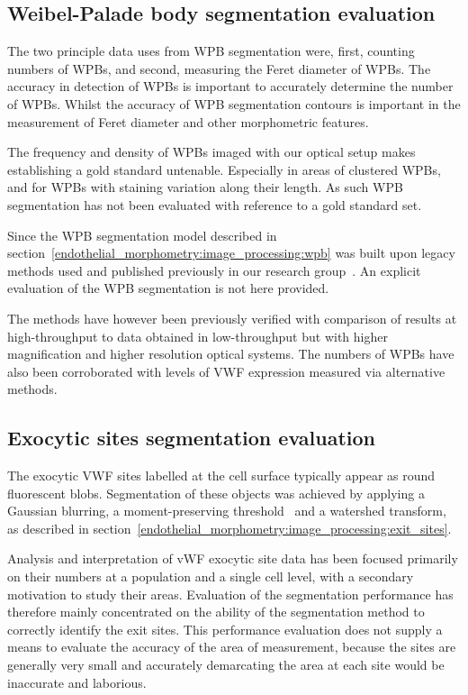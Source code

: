 \subsection{Weibel-Palade body segmentation evaluation}
\label{endothelial_morphometry:performance_evaluation:WPB}
The two principle data uses from WPB segmentation were, first, counting numbers of WPBs, and second, measuring the Feret diameter of WPBs. The accuracy in detection of WPBs is important to accurately determine the number of WPBs. Whilst the accuracy of WPB segmentation contours is important in the measurement of Feret diameter and other morphometric features.

The frequency and density of WPBs imaged with our optical setup makes establishing a gold standard untenable. Especially in areas of clustered WPBs, and for WPBs with staining variation along their length. As such WPB segmentation has not been evaluated with reference to a gold standard set.

Since the WPB segmentation model described in section~\ref{endothelial_morphometry:image_processing:wpb} was built upon legacy methods used and published previously in our research group~\cite{Ferraro2014, Stevenson2014}. An explicit evaluation of the WPB segmentation is not here provided.

The methods have however been previously verified with comparison of results at high-throughput to data obtained in low-throughput but with higher magnification and higher resolution optical systems. The numbers of WPBs have also been corroborated with levels of VWF expression measured via alternative methods.

\subsection{Exocytic sites segmentation evaluation}
\label{endothelial_morphometry:performance_evaluation:exit_sites}
The exocytic VWF sites labelled at the cell surface typically appear as round fluorescent blobs. Segmentation of these objects was achieved by applying a Gaussian blurring, a moment-preserving threshold~\cite{Tsai1985} and a watershed transform, as described in section~\ref{endothelial_morphometry:image_processing:exit_sites}.

Analysis and interpretation of vWF exocytic site data has been focused primarily on their numbers at a population and a single cell level, with a secondary motivation to study their areas. Evaluation of the segmentation performance has therefore mainly concentrated on the ability of the segmentation method to correctly identify the exit sites. This performance evaluation does not supply a means to evaluate the accuracy of the area of measurement, because the sites are generally very small and accurately demarcating the area at each site would be inaccurate and laborious.

